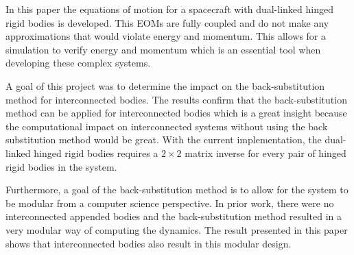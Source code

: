 \documentclass[paper]{aiaaNew}
\begin{document}
	In this paper the equations of motion for a spacecraft with dual-linked hinged rigid bodies is developed. This EOMs are fully coupled and do not make any approximations that would violate energy and momentum. This allows for a simulation to verify energy and momentum which is an essential tool when developing these complex systems. 
	
	A goal of this project was to determine the impact on the back-substitution method for interconnected bodies. The results confirm that the back-substitution method can be applied for interconnected bodies which is a great insight because the computational impact on interconnected systems without using the back substitution method would be great. With the current implementation, the dual-linked hinged rigid bodies requires a $2\times 2$ matrix inverse for every pair of hinged rigid bodies in the system. 
	
	Furthermore, a goal of the back-substitution method is to allow for the system to be modular from a computer science perspective. In prior work, there were no interconnected appended bodies and the back-substitution method resulted in a very modular way of computing the dynamics. The result presented in this paper shows that interconnected bodies also result in this modular design. 
	
	
	
\end{document}
